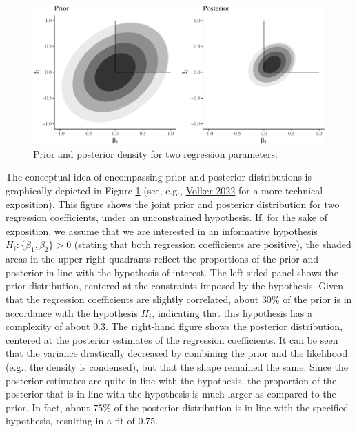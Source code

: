 \documentclass[
  11pt,
]{article}
\begin{document}
\noindent

\begin{figure}
\centering
\includegraphics{thesis_volker_files/figure-latex/density-1.pdf}
\caption{\label{fig:density}Prior and posterior density for two regression parameters.}
\end{figure}

\setlength{\parindent}{0.2in}
\setlength{\leftskip}{0in}

\noindent

The conceptual idea of encompassing prior and posterior distributions is graphically depicted in Figure \ref{fig:density} (see, e.g., \protect\hyperlink{ref-volker_bes_2022}{Volker 2022} for a more technical exposition).
This figure shows the joint prior and posterior distribution for two regression coefficients, under an unconstrained hypothesis.
If, for the sake of exposition, we assume that we are interested in an informative hypothesis \(H_i: \{\beta_1, \beta_2\} > 0\) (stating that both regression coefficients are positive), the shaded areas in the upper right quadrants reflect the proportions of the prior and posterior in line with the hypothesis of interest.
The left-sided panel shows the prior distribution, centered at the constraints imposed by the hypothesis.
Given that the regression coefficients are slightly correlated, about \(30\%\) of the prior is in accordance with the hypothesis \(H_i\), indicating that this hypothesis has a complexity of about \(0.3\).
The right-hand figure shows the posterior distribution, centered at the posterior estimates of the regression coefficients.
It can be seen that the variance drastically decreased by combining the prior and the likelihood (e.g., the density is condensed), but that the shape remained the same.
Since the posterior estimates are quite in line with the hypothesis, the proportion of the posterior that is in line with the hypothesis is much larger as compared to the prior.
In fact, about \(75\%\) of the posterior distribution is in line with the specified hypothesis, resulting in a fit of \(0.75\).
\end{document}
